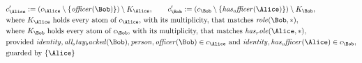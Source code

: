 \begin{align*}
&
c'_
{
\Alice
}
 := 
(c_
{
\Alice
}
 \setminus 
\{
\mathit{
officer
}
(
\Bob
)
\}
) \setminus K_
{
\Alice
}
, \qquad 
c'_
{
\Bob
}
 := 
(c_
{
\Bob
}
 \setminus 
\{
\mathit{
has_officer
}
(
\Alice
)
\}
) \setminus K_
{
\Bob
}
,\\
&
\text{where } K_
{
\Alice
}
 \text{ holds every atom of } c_
{
\Alice
}
 \text{, with its multiplicity, that matches } 
\mathit{
role
}
(
\Bob
,
\ast
)
,\\
&
\text{where } K_
{
\Bob
}
 \text{ holds every atom of } c_
{
\Bob
}
 \text{, with its multiplicity, that matches } 
\mathit{
has_role
}
(
\Alice
,
\ast
)
,\\
&
\text{provided } 
\mathit{
identity
}
,
\mathit{
all_stay_backed
}
(
\Bob
)
,
\mathit{
person
}
,
\mathit{
officer
}
(
\Bob
)
 \in c_
{
\Alice
}
 \text{ and } 
\mathit{
identity
}
,
\mathit{
has_officer
}
(
\Alice
)
 \in c_
{
\Bob
}
,\\
&
\text{guarded by } \{
\Alice
\}
\end{align*}

